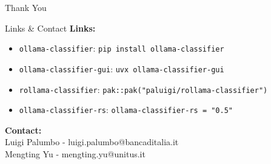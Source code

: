 \documentclass[aspectratio=169,11pt]{beamer}
\begin{document}
\begin{frame}[standout]
  Thank You
\end{frame}

\begin{frame}{Links \& Contact}
  \textbf{Links:}
  \begin{itemize}
    \item \texttt{ollama-classifier}: \texttt{pip install ollama-classifier}
    \item \texttt{ollama-classifier-gui}: \texttt{uvx ollama-classifier-gui}
    \item \texttt{rollama-classifier}:
          \texttt{pak::pak("paluigi/rollama-classifier")}
    \item \texttt{ollama-classifier-rs}: \texttt{ollama-classifier-rs = "0.5"}
  \end{itemize}

  \vspace{0.5em}
  \textbf{Contact:}\\
  Luigi Palumbo - luigi.palumbo@bancaditalia.it \\
  Mengting Yu - mengting.yu@unitus.it
\end{frame}
\end{document}
